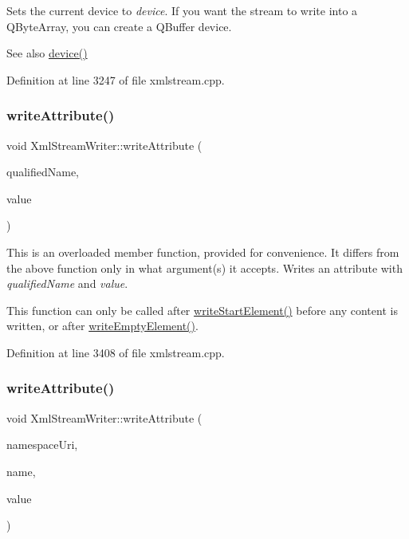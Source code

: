 Sets the current device to {\itshape device}. If you want the stream to write into a Q\+Byte\+Array, you can create a Q\+Buffer device.

\begin{DoxySeeAlso}{See also}
\hyperlink{class_xml_stream_writer_a306a738e0aad39898ee318c7b7c8bc3c}{device()} 
\end{DoxySeeAlso}


Definition at line 3247 of file xmlstream.\+cpp.

\mbox{\label{class_xml_stream_writer_a685d12dc71870e20e835085b6326787b}} 
\subsubsection{\texorpdfstring{write\+Attribute()}{writeAttribute()}\hspace{0.1cm}{\footnotesize\ttfamily [1/3]}}
{\footnotesize\ttfamily void Xml\+Stream\+Writer\+::write\+Attribute (\begin{DoxyParamCaption}\item[{const Q\+String \&}]{qualified\+Name,  }\item[{const Q\+String \&}]{value }\end{DoxyParamCaption})}

This is an overloaded member function, provided for convenience. It differs from the above function only in what argument(s) it accepts. Writes an attribute with {\itshape qualified\+Name} and {\itshape value}.

This function can only be called after \hyperlink{class_xml_stream_writer_aa001c660c1df012b4e37773aa219c379}{write\+Start\+Element()} before any content is written, or after \hyperlink{class_xml_stream_writer_a07e058f896327e9236e7c19132842cf2}{write\+Empty\+Element()}. 

Definition at line 3408 of file xmlstream.\+cpp.

\mbox{\label{class_xml_stream_writer_abfbab3a6a1ad652db31e46d40e727f84}} 
\subsubsection{\texorpdfstring{write\+Attribute()}{writeAttribute()}\hspace{0.1cm}{\footnotesize\ttfamily [2/3]}}
{\footnotesize\ttfamily void Xml\+Stream\+Writer\+::write\+Attribute (\begin{DoxyParamCaption}\item[{const Q\+String \&}]{namespace\+Uri,  }\item[{const Q\+String \&}]{name,  }\item[{const Q\+String \&}]{value }\end{DoxyParamCaption})}

